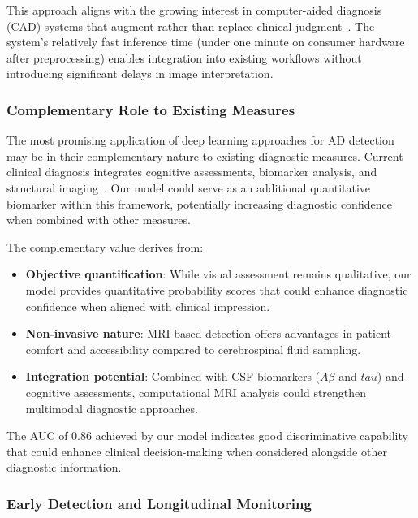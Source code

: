 \documentclass[12pt, a4paper]{article}
\begin{document}
This approach aligns with the growing interest in computer-aided diagnosis (CAD) systems that augment rather than replace clinical judgment~\cite{kloppel2008accuracy}. The system's relatively fast inference time (under one minute on consumer hardware after preprocessing) enables integration into existing workflows without introducing significant delays in image interpretation.

\subsubsection{Complementary Role to Existing Measures}

The most promising application of deep learning approaches for AD detection may be in their complementary nature to existing diagnostic measures. Current clinical diagnosis integrates cognitive assessments, biomarker analysis, and structural imaging~\cite{dubois2007research}. Our model could serve as an additional quantitative biomarker within this framework, potentially increasing diagnostic confidence when combined with other measures.

The complementary value derives from:
\begin{itemize}
    \item \textbf{Objective quantification}: While visual assessment remains qualitative, our model provides quantitative probability scores that could enhance diagnostic confidence when aligned with clinical impression.
    
    \item \textbf{Non-invasive nature}: MRI-based detection offers advantages in patient comfort and accessibility compared to cerebrospinal fluid sampling.
    
    \item \textbf{Integration potential}: Combined with CSF biomarkers ($A\beta$ and $tau$) and cognitive assessments, computational MRI analysis could strengthen multimodal diagnostic approaches.
\end{itemize}

The AUC of 0.86 achieved by our model indicates good discriminative capability that could enhance clinical decision-making when considered alongside other diagnostic information.

\subsubsection{Early Detection and Longitudinal Monitoring}
\end{document}
